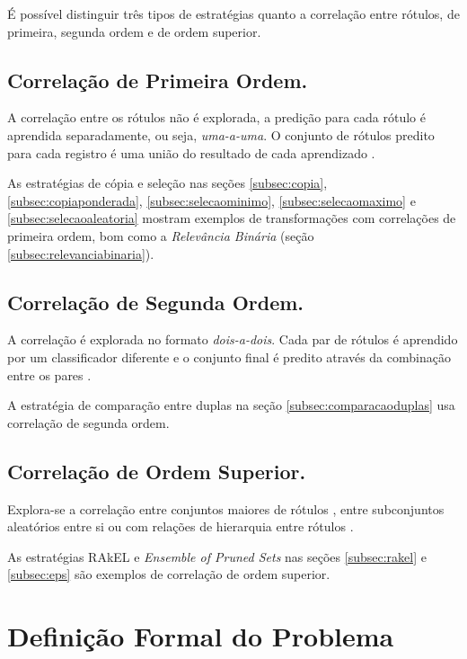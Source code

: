 \documentclass[runningheads,a4paper]{llncs}
\begin{document}
É possível distinguir três tipos de estratégias quanto a correlação entre rótulos, de primeira, segunda ordem e de ordem superior.

\subsection{Correlação de Primeira Ordem.} \label{subsec:corr1ordem}

A correlação entre os rótulos não é explorada, a predição para cada rótulo é aprendida separadamente, ou seja, \emph{uma-a-uma}. O conjunto de rótulos predito para cada registro é uma união do resultado de cada aprendizado \cite{De_Carvalho2009-yp}.

As estratégias de cópia e seleção nas seções \ref{subsec:copia}, \ref{subsec:copiaponderada}, \ref{subsec:selecaominimo}, \ref{subsec:selecaomaximo} e \ref{subsec:selecaoaleatoria} mostram exemplos de transformações com correlações de primeira ordem, bom como a \textit{Relevância Binária} (seção \ref{subsec:relevanciabinaria}).

\subsection{Correlação de Segunda Ordem.} \label{subsec:corr2ordem}

A correlação é explorada no formato \emph{dois-a-dois}. Cada par de rótulos é aprendido por um classificador diferente e o conjunto final é predito através da combinação entre os pares \cite{Hullermeier2008-co}.

A estratégia de comparação entre duplas na seção \ref{subsec:comparacaoduplas} usa correlação de segunda ordem.

\subsection{Correlação de Ordem Superior.} \label{subsec:corrSordem}

Explora-se a correlação entre conjuntos maiores de rótulos \cite{Read2008-bt}, entre subconjuntos aleatórios entre si \cite{Tsoumakas2007-cw} ou com relações de hierarquia entre rótulos \cite{Cesa-Bianchi2006-fk}.

As estratégias RAkEL e \textit{Ensemble of Pruned Sets} nas seções \ref{subsec:rakel} e \ref{subsec:eps} são exemplos de correlação de ordem superior.

\section{Definição Formal do Problema} \label{sec:formal}
\end{document}
